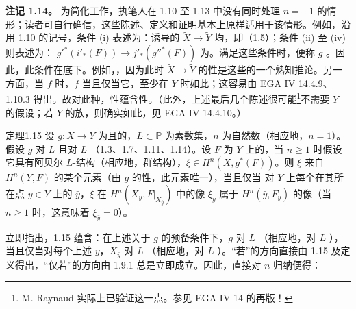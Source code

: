 \textbf{注记 1.14。}
为简化工作，执笔人在 1.10 至 1.13 中没有同时处理 $n=-1$ 的情形；读者可自行确信，这些陈述、定义和证明基本上原样适用于该情形。例如，沿用 1.10 的记号，条件 (i) 表述为：诱导的 $\widetilde X\to\widetilde Y$ 均，即（1.5）；条件 (ii) 至 (iv) 则表述为： $g'^*(i'_*(F))\to j'_*(g''^*(F))$ 为。满足这些条件时，便称 $g$ 。因此，此条件在底下。例如，，因为此时 $\widetilde X\to\widetilde Y$ 的性是这些的一个熟知推论。另一方面，当 $f$ 时，$f$ 当且仅当它，至少在 $Y$ 时如此；这容易由 EGA IV 14.4.9、1.10.3 得出。故对此种，性蕴含性。（此外，上述最后几个陈述很可能\footnote{M. Raynaud 实际上已验证这一点。参见 EGA IV 14 的再版！}不需要 $Y$ 的假设；若 $Y$ 的族，则确实如此，见 EGA IV 14.4.10。）
\begin{SGAresult}{定理}{1.15}
设 $g:X\to Y$ 为且的，$L\subset\mathbb P$ 为素数集，$n$ 为自然数（相应地，$n=1$）。假设 $g$ 对 $L$ 且对 $L$ （1.3、1.7、1.11、1.14）。设 $F$ 为 $Y$ 上的，当 $n\geq1$ 时假设它具有阿贝尔 $L$-结构（相应地，群结构），$\xi\in H^n(X,g^*(F))$。则 $\xi$ 来自 $H^n(Y,F)$ 的某个元素（由 $g$ 的性，此元素唯一），当且仅当
对 $Y$ 上每个在其所在点 $y\in Y$ 上的 $\bar y$，$\xi$ 在 $H^n(X_{\bar y},F|_{X_{\bar y}})$ 中的像 $\xi_{\bar y}$ 属于 $H^n(\bar y,F_{\bar y})$ 的像（当 $n\geq1$ 时，这意味着 $\xi_{\bar y}=0$）。
\end{SGAresult}
立即指出，1.15 蕴含：在上述关于 $g$ 的预备条件下，$g$ 对 $L$ （相应地，对 $L$ ），当且仅当对每个上述 $\bar y$，$X_{\bar y}$ 对 $L$ （相应地，对 $L$ ）。“若”的方向直接由 1.15 及定义得出，“仅若”的方向由 1.9.1 总是立即成立。因此，直接对 $n$ 归纳便得：
